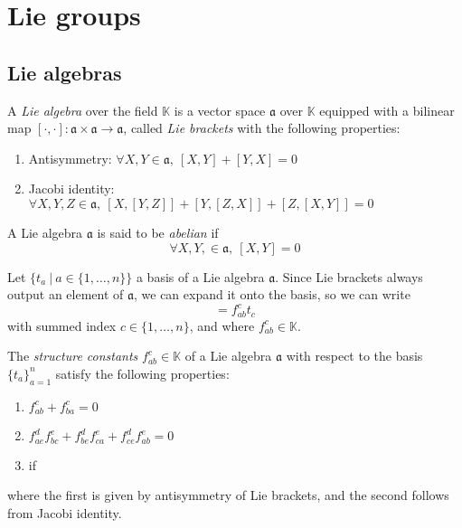 \chapter{Lie groups}

\section{Lie algebras}
\begin{definition}
    A \emph{Lie algebra} over the field $\mathbb{K}$ is a vector space $\mathfrak{a}$ over $\mathbb{K}$ equipped with a bilinear map $[\cdot, \cdot]: \mathfrak{a} \times \mathfrak{a} \rightarrow \mathfrak{a}$, called \emph{Lie brackets} with the following properties:
    \begin{enumerate}
        \item Antisymmetry: $\forall X, Y \in \mathfrak{a},\ [X, Y] + [Y, X] = 0$
        \item Jacobi identity: $\forall X, Y, Z \in \mathfrak{a},\ [X, [Y, Z]] + [Y,[Z,X]] + [Z,[X,Y]] = 0$
    \end{enumerate}
\end{definition}

\begin{definition}
    A Lie algebra $\mathfrak{a}$ is said to be \emph{abelian} if
    \begin{equation*}
        \forall X, Y, \in \mathfrak{a},\ [X,Y] = 0
    \end{equation*}
\end{definition}

\begin{definition}
    Let $\{t_a\ |\ a \in \{1, \ldots, n\}\}$ a basis of a Lie algebra $\mathfrak{a}$. Since Lie brackets always output an element of $\mathfrak{a}$, we can expand it onto the basis, so we can write
    \begin{equation*}
        [t_a, t_b] = f^c_{ab} t_c
    \end{equation*}
    with summed index $c \in \{1, \ldots, n\}$, and where $f^c_{ab} \in \mathbb{K}$.
\end{definition}

\begin{proposition}
    The \emph{structure constants} $f^c_{ab} \in \mathbb{K}$ of a Lie algebra $\mathfrak{a}$ with respect to the basis $\{t_a\}_{a=1}^n$ satisfy the following properties:
    \begin{enumerate}
        \item $f^c_{ab} + f^c_{ba} = 0$
        \item $f^d_{ae}f^e_{bc} + f^d_{be}f^{e}_{ca} + f^d_{ce}f^e_{ab} = 0$
        \item if 
    \end{enumerate}
    where the first is given by antisymmetry of Lie brackets, and the second follows from Jacobi identity.
\end{proposition}

